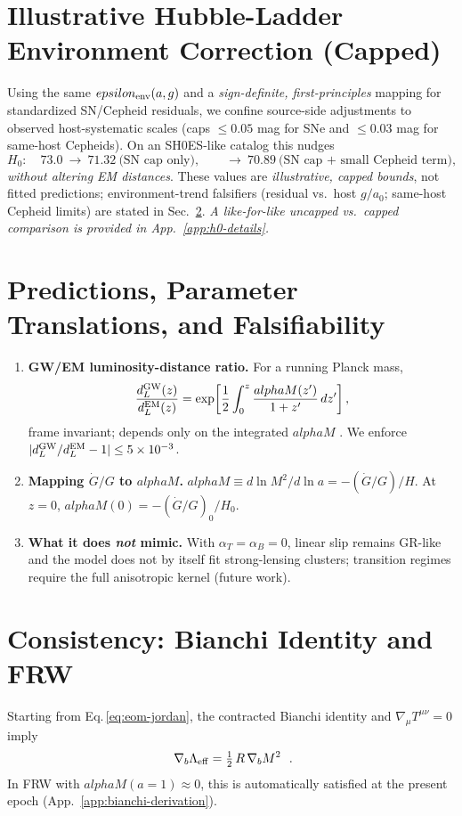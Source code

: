 \documentclass[aps,prd,onecolumn,superscriptaddress,nofootinbib]{revtex4-2}
\def\alphaM{alphaM}%
\def\eps{epsilon}%
\def\boxed#1{#1}%
\newcommand{\alphaM}{\alpha_M}
\newcommand{\eps}{\varepsilon}
\begin{document}
\section{Illustrative Hubble-Ladder Environment Correction (Capped)}
\label{sec:h0-illustration}
Using the same $\eps_{\rm env}(a,g)$ and a \emph{sign-definite, first-principles} mapping for standardized SN/Cepheid residuals, we confine source-side adjustments to observed host-systematic scales (caps $\le 0.05$ mag for SNe and $\le 0.03$ mag for same-host Cepheids). On an SH0ES-like catalog this nudges
\begin{equation}
H_0:\quad 73.0 \ \to\ 71.32\ \text{(SN cap only)},\qquad \to\ 70.89\ \text{(SN cap + small Cepheid term)},
\end{equation}
\emph{without altering EM distances}. These values are \emph{illustrative, capped bounds}, not fitted predictions; environment-trend falsifiers (residual vs.\ host $g/a_0$; same-host Cepheid limits) are stated in Sec.~\ref{sec:predictions}. \emph{A like-for-like uncapped vs.\ capped comparison is provided in App.~\ref{app:h0-details}.}

\section{Predictions, Parameter Translations, and Falsifiability}
\label{sec:predictions}
\begin{enumerate}[leftmargin=1.3em]
\item \textbf{GW/EM luminosity-distance ratio.} For a running Planck mass,
\begin{equation}
\frac{d_L^{\rm GW}(z)}{d_L^{\rm EM}(z)} = \exp\!\left[ \frac{1}{2}\int_{0}^{z} \frac{\alphaM(z')}{1+z'}\,dz' \right],
\end{equation}
frame invariant; depends only on the integrated $\alphaM$ \cite{LombriserTaylor2016}. We enforce $|d_L^{\rm GW}/d_L^{\rm EM}-1|\le 5\times10^{-3}$.
\item \textbf{Mapping $\dot G/G$ to $\alphaM$.}
$\alphaM \equiv d\ln M^2/d\ln a = -(\dot G/G)/H$. At $z=0$, $\alphaM(0)=-(\dot G/G)_0/H_0$.
\item \textbf{What it does \emph{not} mimic.} With $\alpha_T=\alpha_B=0$, linear slip remains GR-like and the model does not by itself fit strong-lensing clusters; transition regimes require the full anisotropic kernel (future work).
\end{enumerate}

\section{Consistency: Bianchi Identity and FRW}
\label{sec:bianchi}
Starting from Eq.\,\eqref{eq:eom-jordan}, the contracted Bianchi identity and $\nabla_\mu T^{\mu\nu}=0$ imply
\begin{equation}
\boxed{\ \nabla_b \Lambda_{\rm eff} = \tfrac{1}{2}\,R\,\nabla_b M^2\ }\ .
\label{eq:bianchi-consistency}
\end{equation}
In FRW with $\alphaM(a{=}1)\approx 0$, this is automatically satisfied at the present epoch (App.~\ref{app:bianchi-derivation}).
\end{document}
